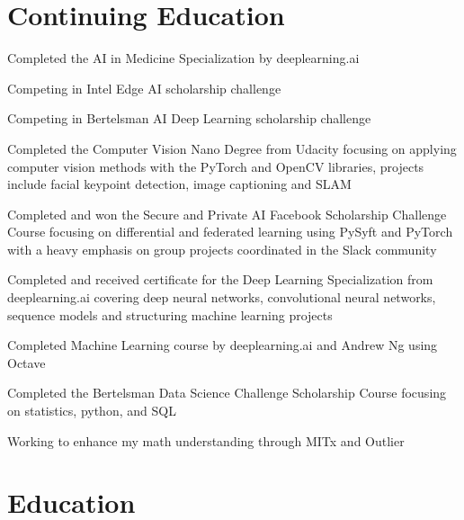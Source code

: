 \documentclass[letterpaper]{resume}
\begin{document}
\section{Continuing Education}

\begin{compactitem}
\item Completed the AI in Medicine Specialization by deeplearning.ai
\item Competing in Intel Edge AI scholarship challenge
\item Competing in Bertelsman AI Deep Learning scholarship challenge
\item Completed the Computer Vision Nano Degree from Udacity focusing on applying computer vision methods with the PyTorch and OpenCV libraries, projects include facial keypoint detection, image captioning and SLAM
\item Completed and won the Secure and Private AI Facebook Scholarship Challenge Course focusing on differential and federated learning using PySyft and PyTorch with a heavy emphasis on group projects coordinated in the Slack community
\item Completed and received certificate for the Deep Learning Specialization from deeplearning.ai covering deep neural networks, convolutional neural networks, sequence models and structuring machine learning projects
\item Completed Machine Learning course by deeplearning.ai and Andrew Ng using Octave
\item Completed the Bertelsman Data Science Challenge Scholarship Course focusing on statistics, python, and SQL
\item Working to enhance my math understanding through MITx and Outlier
\end{compactitem}

\section{Education}
\end{document}
